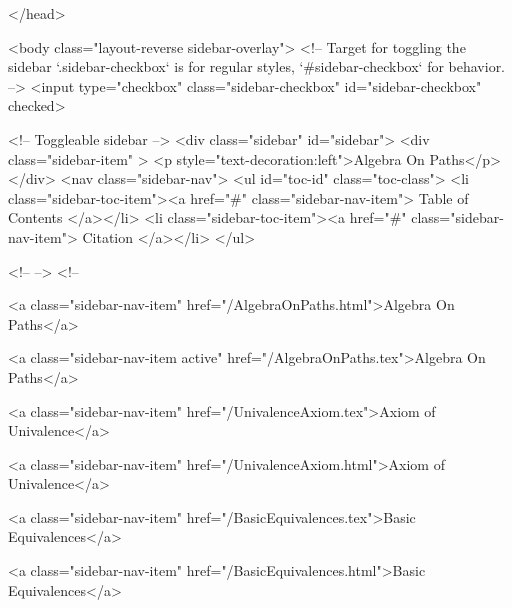   
</head>




  <body class="layout-reverse sidebar-overlay">
    <!-- Target for toggling the sidebar `.sidebar-checkbox` is for regular
     styles, `#sidebar-checkbox` for behavior. -->
<input type="checkbox" class="sidebar-checkbox" id="sidebar-checkbox" checked>

<!-- Toggleable sidebar -->
<div class="sidebar" id="sidebar">
  <div class="sidebar-item" >
    <p style="text-decoration:left">Algebra On Paths</p>
  </div>
  <nav class="sidebar-nav">
    <ul id="toc-id" class="toc-class">
  <li class="sidebar-toc-item"><a href="#" class="sidebar-nav-item"> Table of Contents </a></li>
  <li class="sidebar-toc-item"><a href="#" class="sidebar-nav-item"> Citation </a></li>
</ul>


    <!--  -->
    <!-- 
      
    
      
    
      
    
      
    
      
        
      
    
      
        
          <a class="sidebar-nav-item" href="/AlgebraOnPaths.html">Algebra On Paths</a>
        
      
    
      
        
          <a class="sidebar-nav-item active" href="/AlgebraOnPaths.tex">Algebra On Paths</a>
        
      
    
      
        
          <a class="sidebar-nav-item" href="/UnivalenceAxiom.tex">Axiom of Univalence</a>
        
      
    
      
        
          <a class="sidebar-nav-item" href="/UnivalenceAxiom.html">Axiom of Univalence</a>
        
      
    
      
        
          <a class="sidebar-nav-item" href="/BasicEquivalences.tex">Basic Equivalences</a>
        
      
    
      
        
          <a class="sidebar-nav-item" href="/BasicEquivalences.html">Basic Equivalences</a>
        

